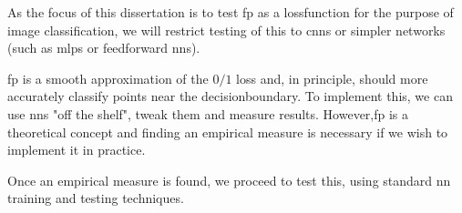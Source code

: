 As the focus of this dissertation is to test \gls{fp} as a \gls{lossfunction} for the purpose of image classification, we will restrict testing of this to \gls{cnn}s or simpler networks (such as  \gls{mlp}s or \gls{feedforward} \gls{nn}s).

 \gls{fp} is a smooth approximation of the $0/1$ loss and, in principle, should more accurately classify points near the \gls{decisionboundary}. To implement this, we can use  \gls{nn}s "off the shelf", tweak them and measure results. However,\gls{fp} is a theoretical concept and finding an empirical measure is necessary if we wish to implement it in practice. 

Once an empirical measure is found, we proceed to test this, using standard \gls{nn} training and testing techniques.

